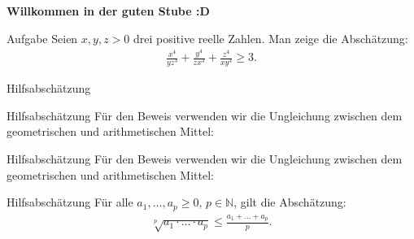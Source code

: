 \documentclass[10pt]{beamer}
\title{}
\author{Artur's Mathematikstübchen}
\date{}
\def\bN{\mathbb{N}}
\begin{document}

\begin{frame}
    \begin{center}
        \textbf{\huge Willkommen in der guten Stube \newline \newline :D}
    \end{center}
\end{frame}




\begin{frame}
    \begin{alertblock}{Aufgabe}
        Seien \( x, y, z > 0 \) drei positive reelle Zahlen. Man zeige die Abschätzung:
        \begin{align*}
            \frac{x^{4}}{y z^{3}} + \frac{y^{4}}{z x^{3}} + \frac{z^{4}}{x y^{3}}
            \geq 3.
        \end{align*}
    \end{alertblock}
\end{frame}



\begin{frame}{Hilfsabschätzung}
    
\end{frame}



\begin{frame}{Hilfsabschätzung}
    Für den Beweis verwenden wir die Ungleichung zwischen dem geometrischen und arithmetischen Mittel:
\end{frame}



\begin{frame}{Hilfsabschätzung}
    Für den Beweis verwenden wir die Ungleichung zwischen dem geometrischen und arithmetischen Mittel:
    \begin{block}{Hilfsabschätzung}
        Für alle \( a_{1}, \ldots, a_{p} \geq 0 \), \( p \in \bN \), gilt die Abschätzung:
        \begin{align*}
            \sqrt[p]{a_{1} \cdot \ldots \cdot a_{p}} 
            \leq \frac{a_{1} + \ldots + a_{p}}{p}.
        \end{align*}
    \end{block}
\end{frame}
\end{document}

